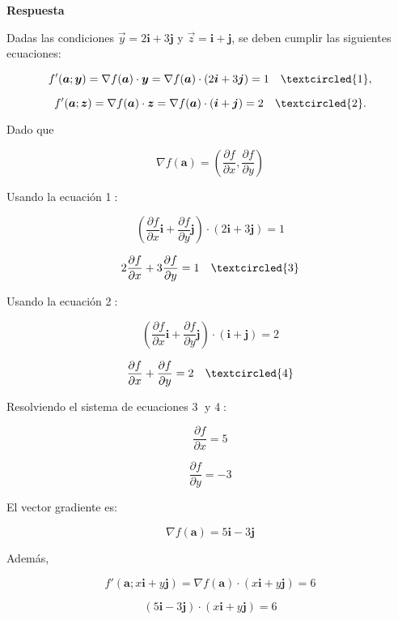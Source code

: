 \documentclass{report}
\begin{document}
    \textbf{Respuesta}

    Dadas las condiciones $\vec{y}=2\boldsymbol{i}+3\boldsymbol{j}$ y $\vec{z}= \boldsymbol{i} + \boldsymbol{j}$, se deben cumplir las siguientes ecuaciones:

    \[
    f'(\boldsymbol{a};\boldsymbol{y}) = \nabla f(\boldsymbol{a}) \cdot \boldsymbol{y} = \nabla f(\boldsymbol{a}) \cdot (2\boldsymbol{i} + 3\boldsymbol{j}) = 1 \quad \textcircled{1},
    \]

    \[
    f'(\boldsymbol{a};\boldsymbol{z}) = \nabla f(\boldsymbol{a}) \cdot \boldsymbol{z} = \nabla f(\boldsymbol{a}) \cdot (\boldsymbol{i} + \boldsymbol{j}) = 2 \quad \textcircled{2}.
    \]

    Dado que

    \[
    \nabla f(\boldsymbol{a}) = \left(\frac{\partial f}{\partial x}, \frac{\partial f}{\partial y}\right)
    \]

    Usando la ecuación \textcircled{1}:

    \[
    \left( \frac{\partial f}{\partial x} \boldsymbol{i} + \frac{\partial f}{\partial y} \boldsymbol{j} \right) \cdot (2\boldsymbol{i} + 3\boldsymbol{j}) = 1
    \]

    \[
    2 \frac{\partial f}{\partial x} + 3 \frac{\partial f}{\partial y} = 1 \quad \textcircled{3}
    \]

    Usando la ecuación \textcircled{2}:

    \[
    \left( \frac{\partial f}{\partial x} \boldsymbol{i} + \frac{\partial f}{\partial y} \boldsymbol{j} \right) \cdot (\boldsymbol{i} + \boldsymbol{j}) = 2
    \]

    \[
    \frac{\partial f}{\partial x} + \frac{\partial f}{\partial y} = 2 \quad \textcircled{4}
    \]

    Resolviendo el sistema de ecuaciones \textcircled{3} y \textcircled{4}:

    \[
    \frac{\partial f}{\partial x} = 5
    \]

    \[
    \frac{\partial f}{\partial y} = -3
    \]

    El vector gradiente es:

    \[
    \nabla f(\boldsymbol{a}) = 5\boldsymbol{i} - 3\boldsymbol{j}
    \]

    Además,

    \[
    f'(\boldsymbol{a}; x \boldsymbol{i} + y \boldsymbol{j}) = \nabla f(\boldsymbol{a}) \cdot (x\boldsymbol{i} + y\boldsymbol{j}) = 6
    \]

    \[
    (5\boldsymbol{i} - 3\boldsymbol{j}) \cdot (x\boldsymbol{i} + y\boldsymbol{j}) = 6
    \]
\end{document}
